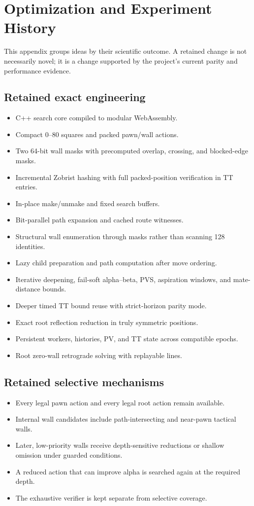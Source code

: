 \section{Optimization and Experiment History}
This appendix groups ideas by their scientific outcome. A retained change is not necessarily novel; it is a change supported by the project's current parity and performance evidence.

\subsection{Retained exact engineering}
\begin{itemize}
\item C++ search core compiled to modular WebAssembly.
\item Compact 0--80 squares and packed pawn/wall actions.
\item Two 64-bit wall masks with precomputed overlap, crossing, and blocked-edge masks.
\item Incremental Zobrist hashing with full packed-position verification in TT entries.
\item In-place make/unmake and fixed search buffers.
\item Bit-parallel path expansion and cached route witnesses.
\item Structural wall enumeration through masks rather than scanning 128 identities.
\item Lazy child preparation and path computation after move ordering.
\item Iterative deepening, fail-soft alpha--beta, PVS, aspiration windows, and mate-distance bounds.
\item Deeper timed TT bound reuse with strict-horizon parity mode.
\item Exact root reflection reduction in truly symmetric positions.
\item Persistent workers, histories, PV, and TT state across compatible epochs.
\item Root zero-wall retrograde solving with replayable lines.
\end{itemize}

\subsection{Retained selective mechanisms}
\begin{itemize}
\item Every legal pawn action and every legal root action remain available.
\item Internal wall candidates include path-intersecting and near-pawn tactical walls.
\item Later, low-priority walls receive depth-sensitive reductions or shallow omission under guarded conditions.
\item A reduced action that can improve alpha is searched again at the required depth.
\item The exhaustive verifier is kept separate from selective coverage.
\end{itemize}


